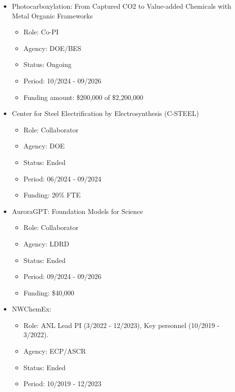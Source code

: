 \begin{itemize}
\begin{itemize}
        \item Status: Ongoing
        \item Period: 10/2024 - 09/2026
        \item Funding amount: \$50,000 of total \$250,000
        \end{itemize}
    \item Photocarboxylation: From Captured CO2 to Value-added Chemicals with Metal Organic Frameworks
        \begin{itemize}
        \item Role: Co-PI
        \item Agency: DOE/BES
        \item Status: Ongoing
        \item Period: 10/2024 - 09/2026
        \item Funding amount: \$200,000 of \$2,200,000
        \end{itemize}
        \item Center for Steel Electrification by Electrosynthesis (C-STEEL)
        \begin{itemize}
        \item Role: Collaborator
        \item Agency: DOE
        \item Status: Ended
        \item Period: 06/2024 - 09/2024
        \item Funding: 20\% FTE
        \end{itemize}
        \item AuroraGPT: Foundation Models for Science
        \begin{itemize}
        \item Role: Collaborator
        \item Agency: LDRD
        \item Status: Ended
        \item Period: 09/2024 - 09/2026
        \item Funding: \$40,000 
        \end{itemize}
    \item NWChemEx:
        \begin{itemize}
        \item Role: ANL Lead PI (3/2022 - 12/2023), Key personnel (10/2019 - 3/2022). 
        \item Agency: ECP/ASCR
        \item Status: Ended
        \item Period: 10/2019 - 12/2023

\end{itemize}
\end{itemize}

